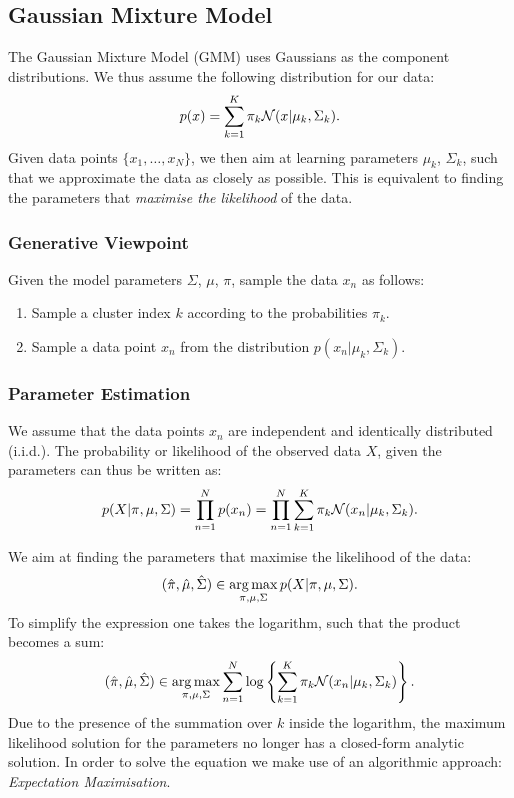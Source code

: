 \subsection{Gaussian Mixture Model}
The Gaussian Mixture Model (GMM) uses Gaussians as the component distributions. We thus assume the following distribution for our data:
\begin{align*}
    p(x) = \sum_{k=1}^K \pi_k \mathcal N (x|\mu_k,\Sigma_k).
\end{align*}
Given data points $\{x_1,\ldots, x_N\}$, we then aim at learning parameters $\mu_k$, $\Sigma_k$, such that we approximate the data as closely as possible. This is equivalent to finding the parameters that \emph{maximise the likelihood} of the data.

\subsubsection{Generative Viewpoint}
Given the model parameters $\Sigma$, $\mu$, $\pi$, sample the data $x_n$ as follows:
\begin{enumerate}
    \item Sample a cluster index $k$ according to the probabilities $\pi_k$.
    \item Sample a data point $x_n$ from the distribution $p(x_n|\mu_k, \Sigma_k)$.
\end{enumerate}

\subsubsection{Parameter Estimation}
We assume that the data points $x_n$ are independent and identically distributed (i.i.d.). The probability or likelihood of the observed data $X$, given the parameters can thus be written as:
\begin{align*}
    p(X|\pi,\mu,\Sigma) = \prod_{n=1}^N p(x_n) = \prod_{n=1}^N\sum_{k=1}^K \pi_k \mathcal N(x_n|\mu_k, \Sigma_k).
\end{align*}

We aim at finding the parameters that maximise the likelihood of the data:
\begin{align*}
(\hat \pi, \hat \mu, \hat \Sigma) \in \operatorname*{arg\,max}_{\pi,\mu,\Sigma} p(X|\pi, \mu, \Sigma).
\end{align*}
To simplify the expression one takes the logarithm, such that the product becomes a sum:
\begin{align*}
(\hat \pi, \hat \mu, \hat \Sigma) \in \operatorname*{arg\,max}_{\pi,\mu,\Sigma}\sum_{n=1}^N 
    \log \left\{ 
        \sum_{k=1}^K \pi_k \mathcal N (x_n|\mu_k, \Sigma_k)
        \right\}.
\end{align*}
Due to the presence of the summation over $k$ inside the logarithm, the maximum likelihood solution for the parameters no longer has a closed-form analytic solution. In order to solve the equation we make use of an algorithmic approach: \emph{Expectation Maximisation}.


